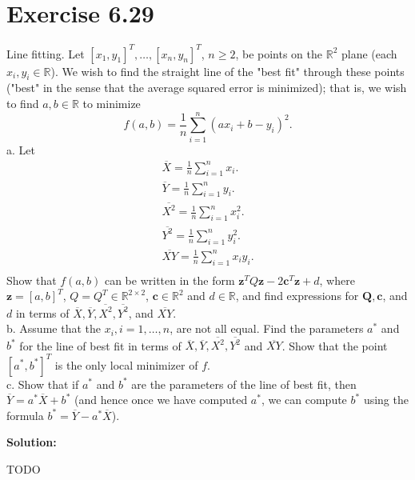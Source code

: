 \documentclass{article}
\newcommand{\bld}[1]{\boldsymbol{#1}}
\begin{document}
\section*{Exercise 6.29}
Line fitting. Let $[x_1,y_1]^T,\dots,[x_n,y_n]^T$, $n\geq 2$, be points on the
$\mathbb{R}^2$ plane (each $x_i,y_i\in \mathbb{R}$). We wish to find the
straight line of the "best fit" through these points ("best" in the sense that
the average squared error is minimized); that is, we wish to find $a,b\in
\mathbb{R}$ to minimize
\[
	f(a,b)=\frac{1}{n} \sum_{i=1}^n(ax_i+b-y_i)^2.
\]
a. Let
\begin{align*}
	\overline{X}=\frac{1}{n}\sum_{i=1}^n x_i.\\
	\overline{Y}=\frac{1}{n}\sum_{i=1}^n y_i.\\
	\overline{X^2}=\frac{1}{n}\sum_{i=1}^n x_i^2.\\
	\overline{Y^2}=\frac{1}{n}\sum_{i=1}^n y_i^2.\\
	\overline{XY}=\frac{1}{n}\sum_{i=1}^n x_iy_i.\\
\end{align*}
Show that $f(a,b)$ can be written in the form $\bld{z}^TQ\bld{z} -
2\bld{c}^T\bld{z} + d$, where $\bld{z}=[a,b]^T$, $Q=Q^T\in \mathbb{R}^{2\times
2}$, $\bld{c}\in \mathbb{R}^2$ and $d\in\mathbb{R}$, and find expressions for
$\bld{Q},\bld{c}$, and $d$ in terms of $\overline{X}, \overline{Y},
\overline{X^2}, \overline{Y^2}$, and $\overline{XY}$.\\
b. Assume that the $x_i, i=1,\dots,n$, are not all equal. Find the parameters
$a^*$ and $b^*$ for the line of best fit in terms of
$\overline{X},\overline{Y},\overline{X^2},\overline{Y^2}$ and $\overline{XY}$.
Show that the point $[a^*,b^*]^T$ is the only local minimizer of $f$.\\
c. Show that if $a^*$ and $b^*$ are the parameters of the line of best fit,
then $\overline{Y}=a^*\overline{X}+b^*$ (and hence once we have computed $a^*$,
we can compute $b^*$ using the formula $b^*=\overline{Y}-a^*\overline{X}$).

\textbf{Solution:}

TODO
\end{document}
